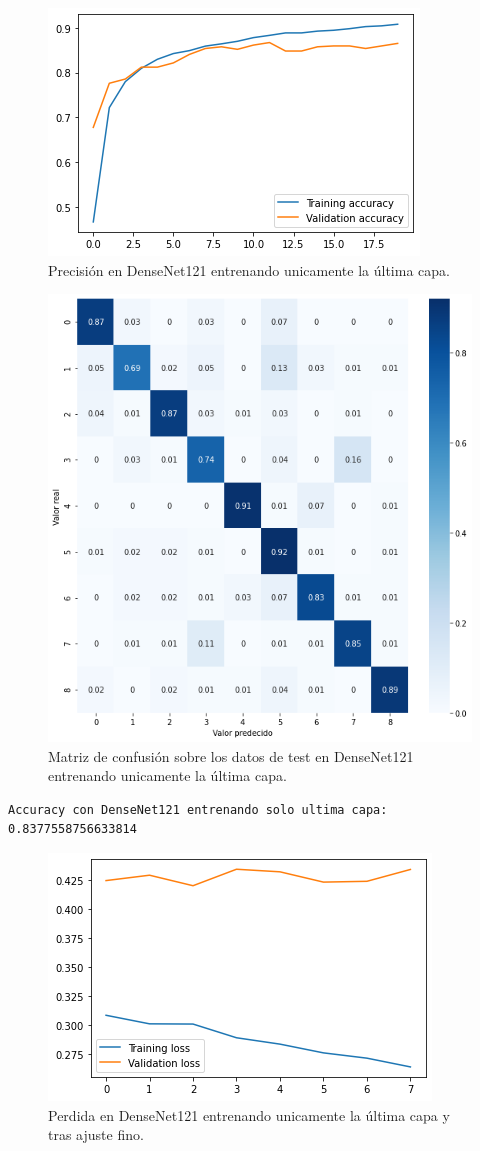 \begin{figure}[H]
  \centering
  \includegraphics[width=0.5\linewidth]{Imagenes/entrenamiento_redes/ult/densenet_ult_acc.png}
  \caption{Precisión en DenseNet121 entrenando unicamente la última capa.}
\end{figure}

\begin{figure}[H]
  \centering
  \includegraphics[width=0.5\linewidth]{Imagenes/entrenamiento_redes/ult/densenet_ult_matriz.png}
  \caption{Matriz de confusión sobre los datos de test en DenseNet121 entrenando unicamente la última capa.}
\end{figure}

\begin{lstlisting}
Accuracy con DenseNet121 entrenando solo ultima capa: 0.8377558756633814
\end{lstlisting}





\begin{figure}[H]
  \centering
  \includegraphics[width=0.5\linewidth]{Imagenes/entrenamiento_redes/ult/densenet_fine_loss.png}
  \caption{Perdida en DenseNet121 entrenando unicamente la última capa y tras ajuste fino.}
\end{figure}


